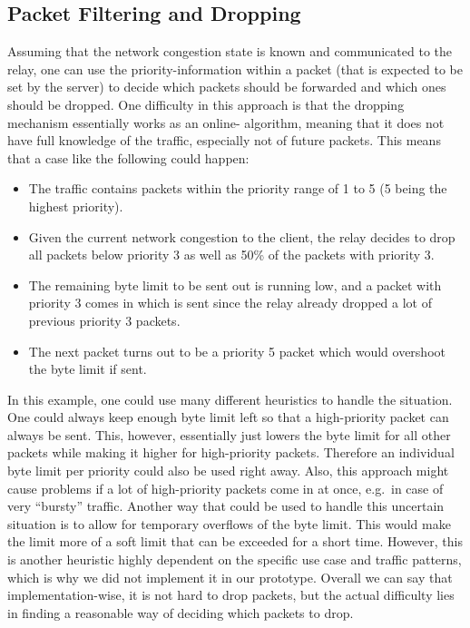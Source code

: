 \subsection{Packet Filtering and Dropping} %
Assuming that the network congestion state is known and communicated to the relay, one can 
use the priority-information within a packet (that is expected to be set by the server) to
decide which packets should be forwarded and which ones should be dropped.
One difficulty in this approach is that the dropping mechanism essentially works as an online-
algorithm, meaning that it does not have full knowledge of the traffic, especially not of 
future packets.
This means that a case like the following could happen:
\begin{itemize}
    \item The traffic contains packets within the priority range of 1 to 5 (5 being the highest priority).
    \item Given the current network congestion to the client, the relay decides to drop 
            all packets below priority 3 as well as 50\% of the packets with priority 3.
    \item The remaining byte limit to be sent out is running low, and a packet with priority 3 
            comes in which is sent since the relay already dropped a lot of previous priority 3 packets.
    \item The next packet turns out to be a priority 5 packet which would overshoot the byte limit if sent.
\end{itemize}
In this example, one could use many different heuristics to handle the situation.
One could always keep enough byte limit left so that a high-priority packet can always be sent.
This, however, essentially just lowers the byte limit for all other packets while making it higher 
for high-priority packets.
Therefore an individual byte limit per priority could also be used right away.
Also, this approach might cause problems if a lot of high-priority packets come in at once, 
e.g.~in case of very ``bursty'' traffic.
Another way that could be used to handle this uncertain situation is to allow for temporary 
overflows of the byte limit.
This would make the limit more of a soft limit that can be exceeded for a short time.
However, this is another heuristic highly dependent on the specific use case and
traffic patterns, which is why we did not implement it in our prototype.
Overall we can say that implementation-wise, it is not hard to drop packets, but the actual
difficulty lies in finding a reasonable way of deciding which packets to drop.